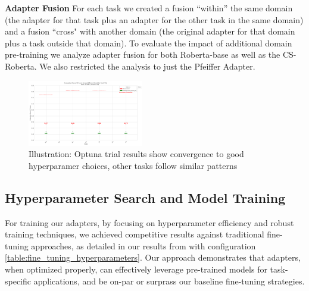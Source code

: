 \documentclass[10pt,twocolumn,letterpaper]{article}
\begin{document}
\textbf{Adapter Fusion} For each task we created a fusion “within” the same domain (the adapter for that task plus an adapter for the other task in the same domain) and a fusion “cross" with another domain (the original adapter for that domain plus a task outside that domain). To evaluate the impact of additional domain pre-training we analyze adapter fusion for both Roberta-base as well as the CS-Roberta. We also restricted the analysis to just the Pfeiffer Adapter.

\begin{figure}[h]
    \centering 
    \includegraphics[width=0.45\textwidth]{resources/SCIERC/v01/evaluation_macro_f1_across_seeds.png}
    \caption{Illustration: Optuna trial results show convergence to good hyperparamer choices, other tasks follow similar patterns}
    \label{fig:optuna_search_trials}
\end{figure}

\subsection{Hyperparameter Search and Model Training} 

For training our adapters, by focusing on hyperparameter efficiency and robust training techniques, we achieved competitive results against traditional fine-tuning approaches, as detailed in our results from  with configuration \ref{table:fine_tuning_hyperparameters}. Our approach demonstrates that adapters, when optimized properly, can effectively leverage pre-trained models for task-specific applications, and be on-par or surprass our baseline fine-tuning strategies.
\end{document}
